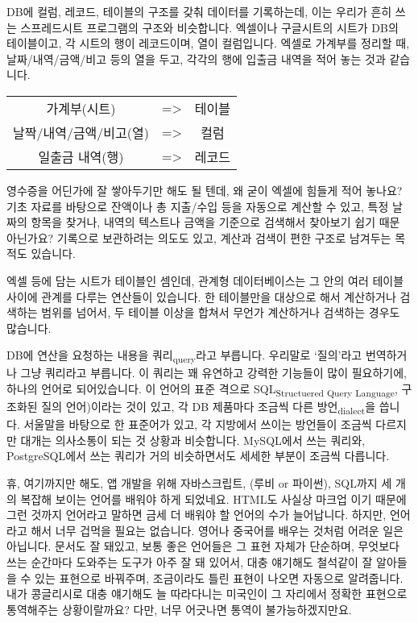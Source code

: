\documentclass[11pt,a4paper]{article}
\begin{document}
DB에 컬럼, 레코드, 테이블의 구조를 갖춰 데이터를 기록하는데, 이는 우리가 흔히 쓰는 스프레드시트 프로그램의 구조와 비슷합니다. 엑셀이나 구글시트의 시트가 DB의 테이블이고, 각 시트의 행이 레코드이며, 열이 컬럼입니다. 엑셀로 가계부를 정리할 때, 날짜/내역/금액/비고 등의 열을 두고, 각각의 행에 입출금 내역을 적어 놓는 것과 같습니다.

\begin{tabular}{|c|c|c|}
  \hline
  가계부(시트) & => & 테이블  \\
  날짝/내역/금액/비고(열) & => & 컬럼 \\
  일출금 내역(행) & => & 레코드 \\
  \hline
\end{tabular}

영수증을 어딘가에 잘 쌓아두기만 해도 될 텐데, 왜 굳이 엑셀에 힘들게 적어 놓나요? 기초 자료를 바탕으로 잔액이나 총 지출/수입 등을 자동으로 계산할 수 있고, 특정 날짜의 항목을 찾거나, 내역의 텍스트나 금액을 기준으로 검색해서 찾아보기 쉽기 때문 아닌가요? 기록으로 보관하려는 의도도 있고, 계산과 검색이 편한 구조로 남겨두는 목적도 있습니다.

엑셀 등에 담는 시트가 테이블인 셈인데, 관계형 데이터베이스는 그 안의 여러 테이블 사이에 관계를 다루는 연산들이 있습니다. 한 테이블만을 대상으로 해서 계산하거나 검색하는 범위를 넘어서, 두 테이블 이상을 합쳐서 무언가 계산하거나 검색하는 경우도 많습니다.

DB에 연산을 요청하는 내용을 쿼리\textsubscript{query}라고 부릅니다. 우리말로 `질의'라고 번역하거나 그냥 쿼리라고 부릅니다. 이 쿼리는 꽤 유연하고 강력한 기능들이 많이 필요하기에, 하나의 언어로 되어있습니다. 이 언어의 표준 격으로  SQL\textsubscript{Structuered Query Language}, 구조화된 질의 언어)이라는 것이 있고, 각 DB 제품마다 조금씩 다른 방언\textsubscript{dialect}을 씁니다. 서울말을 바탕으로 한 표준어가 있고, 각 지방에서 쓰이는 방언들이 조금씩 다르지만 대개는 의사소통이 되는 것 상황과 비슷합니다. MySQL에서 쓰는 쿼리와, PostgreSQL에서 쓰는 쿼리가 거의 비슷하면서도 세세한 부분이 조금씩 다릅니다.

휴, 여기까지만 해도, 앱 개발을 위해 자바스크립트, (루비 or 파이썬), SQL까지 세 개의 복잡해 보이는 언어를 배워야 하게 되었네요. HTML도 사실상 마크업 이기 때문에 그런 것까지 언어라고 말하면 금세 더 배워야 할 언어의 수가 늘어납니다. 하지만, 언어라고 해서 너무 겁먹을 필요는 없습니다. 영어나 중국어를 배우는 것처럼 어려운 일은 아닙니다. 문서도 잘 돼있고, 보통 좋은 언어들은 그 표현 자체가 단순하며, 무엇보다 쓰는 순간마다 도와주는 도구가 아주 잘 돼 있어서, 대충 얘기해도 철석같이 잘 알아들을 수 있는 표현으로 바꿔주며, 조금이라도 틀린 표현이 나오면 자동으로 알려줍니다. 내가 콩글리시로 대충 얘기해도 늘 따라다니는 미국인이 그 자리에서 정확한 표현으로 통역해주는 상황이랄까요? 다만, 너무 어긋나면 통역이 불가능하겠지만요.
\end{document}
